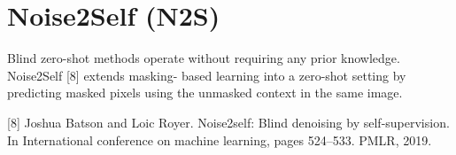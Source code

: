 \chapter{Noise2Self (N2S)}

Blind zero-shot methods operate without requiring any prior
knowledge. Noise2Self [8] extends masking- based learning into a
zero-shot setting by predicting masked pixels using the unmasked
context in the same image. %

[8] Joshua Batson and Loic Royer. Noise2self: Blind denoising by self-supervision. In International conference on
machine learning, pages 524–533. PMLR, 2019.